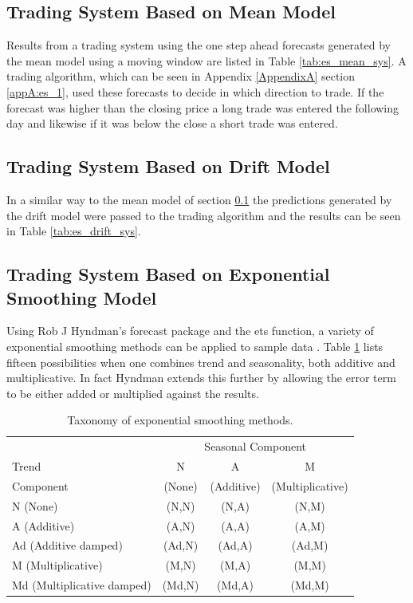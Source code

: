 \subsection{Trading System Based on Mean Model}
\label{sec:es:mean}
Results from a trading system using the one step ahead forecasts generated by the mean model using a moving window are listed in Table \ref{tab:es_mean_sys}. A trading algorithm, which can be seen in Appendix \ref{AppendixA} section \ref{appA:es_1}, used these forecasts to decide in which direction to trade. If the forecast was higher than the closing price a long trade was entered the following day and likewise if it was below the close a short trade was entered.




\subsection{Trading System Based on Drift Model}
In a similar way to the mean model of section \ref{sec:es:mean} the predictions generated by the drift model were passed to the trading algorithm and the results can be seen in Table \ref{tab:es_drift_sys}. 



\subsection{Trading System Based on Exponential Smoothing Model}

Using Rob J Hyndman's forecast package and the ets function, a variety of exponential smoothing methods can be applied to sample data \citep{Hyndman08automatictime}. Table \ref{tab:tax_em} lists fifteen possibilities when one combines trend and seasonality, both additive and multiplicative. In fact Hyndman extends this further by allowing the error term to be either added or multiplied against the results. 

\begin{table}[ht]
\centering
\caption[Taxonomy of exponential smoothing methods]{Taxonomy of exponential smoothing methods.} 
\label{tab:tax_em}
\begin{tabular}{lccc}
  \toprule 
            & \multicolumn{3}{c}{Seasonal Component} \\
  \cmidrule(r){2-4}
  Trend     & N      & A          & M       \\ 
  Component &(None)  &(Additive)  & (Multiplicative)  \\
  \midrule 
  N (None) & (N,N)&(N,A)&(N,M)  \\ 
  A (Additive) & (A,N)&	(A,A)&(A,M)  \\ 
  Ad (Additive damped) &(Ad,N)&(Ad,A)&(Ad,M) \\ 
  M (Multiplicative) &(M,N)&(M,A)&(M,M)  \\ 
  Md (Multiplicative damped) &(Md,N)&(Md,A)&(Md,M) \\ 
   \bottomrule \end{tabular}
\end{table}

